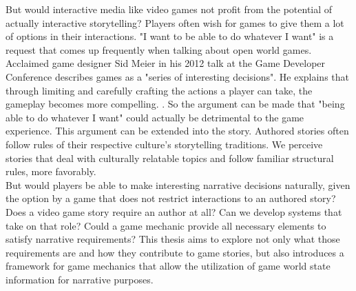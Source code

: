 But would interactive media like video games not profit from the potential of actually interactive storytelling? Players often wish for games to give them a lot of options in their interactions. "I want to be able to do whatever I want" is a request that comes up frequently when talking about open world games. Acclaimed game designer Sid Meier in his 2012 talk at the Game Developer Conference describes games as a "series of interesting decisions". He explains that through limiting and carefully crafting the actions a player can take, the gameplay becomes more compelling. \cite{Dring2018}. So the argument can be made that "being able to do whatever I want" could actually be detrimental to the game experience. This argument can be extended into the story. Authored stories often follow rules of their respective culture's storytelling traditions. We perceive stories that deal with culturally relatable topics and follow familiar structural rules, more favorably. \cite{Cooney2017}\\
But would players be able to make interesting narrative decisions naturally, given the option by a game that does not restrict interactions to an authored story? Does a video game story require an author at all? Can we  develop systems that take on that role? Could a game mechanic provide all necessary elements to satisfy narrative requirements? This thesis aims to explore not only what those requirements are and how they contribute to game stories, but also introduces a framework for game mechanics that allow the utilization of game world state information for narrative purposes.\\
